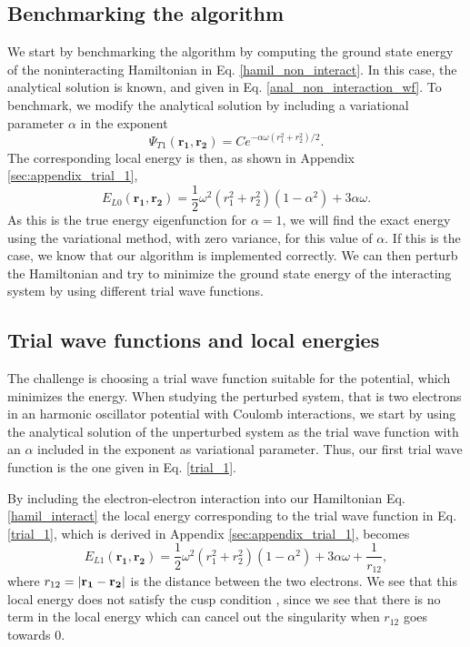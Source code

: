 \documentclass[%
 reprint,
nofootinbib,
aps,
]{revtex4-1}
\begin{document}
\subsection{Benchmarking the algorithm}
We start by benchmarking the algorithm by computing the ground state energy of the noninteracting Hamiltonian in Eq. \eqref{hamil_non_interact}. In this case, the analytical solution is known, and given in Eq. \eqref{anal_non_interaction_wf}. To benchmark, we modify the analytical solution by including a variational parameter $\alpha$ in the exponent
\begin{equation}
  \Psi_{T1}(\mathbf{r_1}, \mathbf{r_2}) = C e^{-\alpha\omega(r_1^2 + r_2^2)/2}.\label{trial_1}
\end{equation}
The corresponding local energy is then, as shown in Appendix \vref{sec:appendix_trial_1},
\begin{equation}
  E_{L0}(\mathbf{r_1}, \mathbf{r_2}) = \frac{1}{2}\omega^2\left(r_1^2 + r_2^2 \right)\left( 1 - \alpha^2  \right) + 3\alpha \omega. \label{energy_0}
\end{equation}
As this is the true energy eigenfunction for $\alpha = 1$, we will find the exact energy using the variational method, with zero variance, for this value of $\alpha$. If this is the case, we know that our algorithm is implemented correctly. We can then perturb the Hamiltonian and try to minimize the ground state energy of the interacting system by using different trial wave functions.

\subsection{Trial wave functions and local energies}

The challenge is choosing a trial wave function suitable for the potential, which minimizes the energy. When studying the perturbed system, that is two electrons in an harmonic oscillator potential with Coulomb interactions, we start by using the analytical solution of the unperturbed system as the trial wave function with an $\alpha$ included in the exponent as variational parameter. Thus, our first trial wave function is the one given in Eq. \eqref{trial_1}.

By including the electron-electron interaction into our Hamiltonian Eq. \eqref{hamil_interact} the local energy corresponding to the trial wave function in Eq. \eqref{trial_1}, which is derived in Appendix \vref{sec:appendix_trial_1}, becomes
\begin{equation}
  E_{L1}(\mathbf{r_1}, \mathbf{r_2}) = \frac{1}{2}\omega^2\left(r_1^2 + r_2^2 \right)\left( 1 - \alpha^2  \right) + 3\alpha \omega + \frac{1}{r_{12}}, \label{energy_1}
\end{equation}
where $r_{12} = \abs{\mathbf{r_1} - \mathbf{r_2}}$ is the distance between the two electrons. We see that this local energy does not satisfy the cusp condition \cite{kvaal}, since we see that there is no term in the local energy which can cancel out the singularity when $r_{12}$ goes towards $0$.
\end{document}
